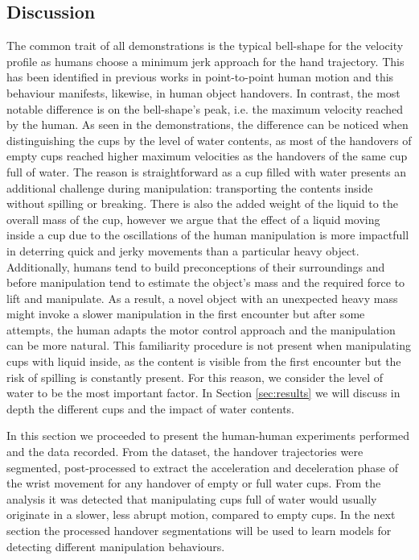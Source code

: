 \subsection{Discussion}

The common trait of all demonstrations is the typical bell-shape for the velocity profile as humans choose a minimum jerk approach for the hand trajectory. This has been identified in previous works in point-to-point human motion \cite{flash} and this behaviour manifests, likewise, in human object handovers. In contrast, the most notable difference is on the bell-shape's peak, i.e. the maximum velocity reached by the human. As seen in the demonstrations, the difference can be noticed when distinguishing the cups by the level of water contents, as most of the handovers of empty cups reached higher maximum velocities as the handovers of the same cup full of water. The reason is straightforward as a cup filled with water presents an additional challenge during manipulation: transporting the contents inside without spilling or breaking. There is also the added weight of the liquid to the overall mass of the cup, however we argue that the effect of a liquid moving inside a cup due to the oscillations of the human manipulation is more impactfull in deterring quick and jerky movements than a particular heavy object. Additionally, humans tend to build preconceptions of their surroundings and before manipulation tend to estimate the object's mass and the required force to lift and manipulate. As a result, a novel object with an unexpected heavy mass might invoke a slower manipulation in the first encounter but after some attempts, the human adapts the motor control approach and the manipulation can be more natural. This familiarity procedure is not present when manipulating cups with liquid inside, as the content is visible from the first encounter but the risk of spilling is constantly present. For this reason, we consider the level of water to be the most important factor. In Section \ref{sec:results} we will discuss in depth the different cups and the impact of water contents. 

In this section we proceeded to present the human-human experiments performed and the data recorded. From the dataset, the handover trajectories were segmented, post-processed to extract the acceleration and deceleration phase of the wrist movement for any handover of empty or full water cups. From the analysis it was detected that manipulating cups full of water would usually originate in a slower, less abrupt motion, compared to empty cups. In the next section the processed handover segmentations will be used to learn models for detecting different manipulation behaviours.

